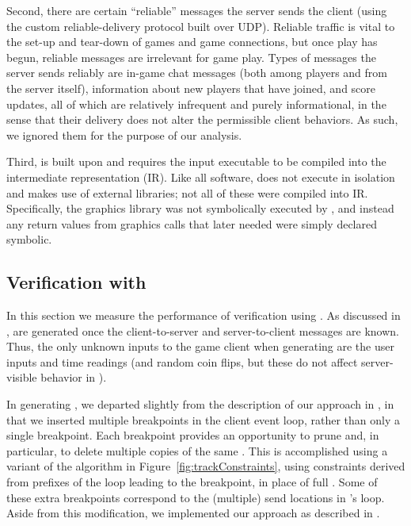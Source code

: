 Second, there are certain ``reliable'' messages the server sends the
client (using the custom reliable-delivery protocol built over UDP).
Reliable traffic is vital to the set-up and tear-down of games and
game connections, but once play has begun, reliable messages are
irrelevant for game play.  Types of messages the server sends reliably
are in-game chat messages (both among players and from the server
itself), information about new players that have joined, and score
updates, all of which are relatively infrequent and purely
informational, in the sense that their delivery does not alter the
permissible client behaviors.  As such, we ignored them for the
purpose of our analysis.

Third, \klee is built upon \llvm and requires the input executable to
be compiled into the \llvm intermediate representation (IR). Like all
software, \xpilot does not execute in isolation and makes use of
external libraries; not all of these were compiled into \llvm IR.
Specifically, the graphics library was not symbolically executed by
\klee, and instead any return values from graphics calls that \xpilot
later needed were simply declared symbolic.

\subsection{Verification with \Lazy \PathsegCons}
\label{ssec:scv:xpilot:lazy}

In this section we measure the performance of verification using \lazy
\pathsegcons.  As discussed in , \lazy
\pathsegcons are generated once the client-to-server and
server-to-client messages are known.  Thus, the only unknown inputs to
the game client when generating \lazy \pathsegcons are the user inputs
and time readings (and random coin flips, but these do not affect
server-visible behavior in \xpilot).

In generating \lazy \pathsegcons, we departed slightly from the
description of our approach in , in that we
inserted multiple breakpoints in the client event loop, rather than
only a single breakpoint.  Each breakpoint provides an opportunity to
prune \execpathcons and, in particular, to delete multiple copies of
the same \execpathcon.  This is accomplished using a variant of the
algorithm in Figure~\ref{fig:trackConstraints}, using constraints
derived from prefixes of the loop leading to the breakpoint, in place
of full \pathsegcons.  Some of these extra breakpoints correspond to
the (multiple) send locations in \xpilot's loop.  Aside from this
modification, we implemented our approach as described in
.


